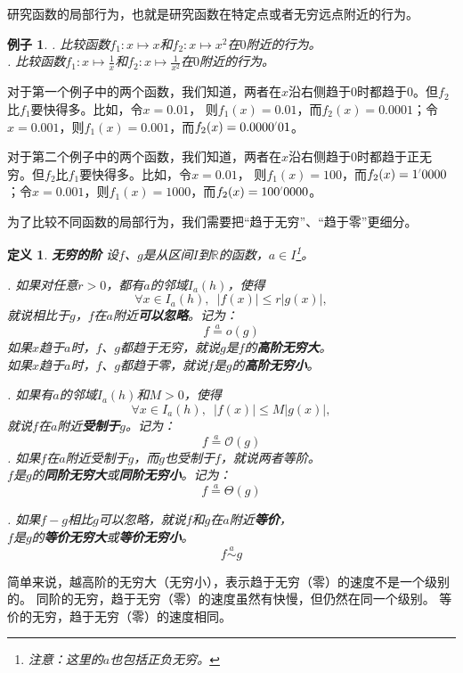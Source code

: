 \documentclass[12pt,UTF8]{ctexbook}
\newcommand{\dlim}[1]{^{\color{gray}\prime}#1}
\newcommand{\oveq}[1]{\overset{#1}{=}}
\newcommand{\olim}[1]{\mathit{o}\left(#1\right)}  %
\newcommand{\Olim}[1]{\mathcal{O}\left(#1\right)}  %
\newcommand{\Tlim}[1]{\mathcal{\Theta}\left(#1\right)}  %
\newcommand{\eqlim}[1]{\overset{#1}{\sim}}  %
\newtheorem{df}{定义}[section]
\newtheorem{ex}{例子}[section]
\begin{document}
研究函数的局部行为，也就是研究函数在特定点或者无穷远点附近的行为。

\begin{ex}
    . 比较函数$f_1: x\mapsto x$和$f_2: x\mapsto x^2$在$0$附近的行为。\\
    . 比较函数$f_1: x\mapsto \frac{1}{x}$和$f_2: x\mapsto \frac{1}{x^2}$在$0$附近的行为。
\end{ex}

对于第一个例子中的两个函数，我们知道，两者在$x$沿右侧趋于$0$时都趋于$0$。但$f_2$比$f_1$要快得多。比如，令$x=0.01$，
则$f_1(x) = 0.01$，而$f_2(x) = 0.0001$；令$x=0.001$，则$f_1(x) = 0.001$，而$f_2(x) = 0.0000\dlim{01}$。

对于第二个例子中的两个函数，我们知道，两者在$x$沿右侧趋于$0$时都趋于正无穷。但$f_2$比$f_1$要快得多。比如，令$x=0.01$，
则$f_1(x) = 100$，而$f_2(x) = 1\dlim{0000}$；令$x=0.001$，则$f_1(x) = 1000$，而$f_2(x) = 100\dlim{0000}$。

为了比较不同函数的局部行为，我们需要把“趋于无穷”、“趋于零”更细分。

\begin{df}{\textbf{无穷的阶}}
    设$f$、$g$是从区间$I$到$\mathbb{R}$的函数，$a\in I$\footnote{注意：这里的$a$也包括正负无穷。}。

    . 如果对任意$r>0$，都有$a$的邻域$I_a(h)$，使得
    $$ \forall x \in I_a(h), \,\,\, |f(x)| \leqslant r |g(x)|,$$
    \indent 就说相比于$g$，$f$在$a$附近\textbf{可以忽略}。记为：
    $$ f \oveq{a} \olim{g}$$
    \indent 如果$x$趋于$a$时，$f$、$g$都趋于无穷，就说$g$是$f$的\textbf{高阶无穷大}。\\
    \indent 如果$x$趋于$a$时，$f$、$g$都趋于零，就说$f$是$g$的\textbf{高阶无穷小}。

    . 如果有$a$的邻域$I_a(h)$和$M > 0$，使得
    $$ \forall x \in I_a(h), \,\,\, |f(x)| \leqslant M |g(x)|,$$
    \indent 就说$f$在$a$附近\textbf{受制于}$g$。记为：
    $$ f \oveq{a} \Olim{g}$$
    . 如果$f$在$a$附近受制于$g$，而$g$也受制于$f$，就说两者等阶。\\
    \indent $f$是$g$的\textbf{同阶无穷大}或\textbf{同阶无穷小}。记为：
    $$ f \oveq{a} \Tlim{g}$$

    . 如果$f - g$相比$g$可以忽略，就说$f$和$g$在$a$附近\textbf{等价}，\\
    \indent $f$是$g$的\textbf{等价无穷大}或\textbf{等价无穷小}。
    $$ f \eqlim{a} g$$

\end{df}

简单来说，越高阶的无穷大（无穷小），表示趋于无穷（零）的速度不是一个级别的。
同阶的无穷，趋于无穷（零）的速度虽然有快慢，但仍然在同一个级别。
等价的无穷，趋于无穷（零）的速度相同。
\end{document}
